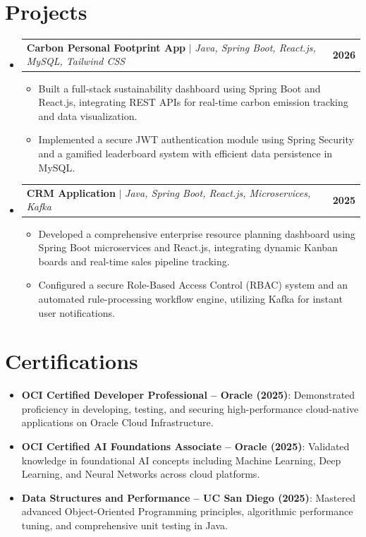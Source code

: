 \documentclass[letterpaper,11pt]{article}
\makeatletter
\newcommand{\resumeItem}[1]{
  \item\small{
    {#1 \vspace{-2pt}}
  }
}
\newcommand{\resumeProjectHeading}[2]{
    \item
    \begin{tabular*}{1.001\textwidth}{l@{\extracolsep{\fill}}r}
      \small#1 & \textbf{\small #2}\\
    \end{tabular*}\vspace{-7pt}
}
\newcommand{\resumeSubHeadingListStart}{\begin{itemize}[leftmargin=0.0in, label={}]}
\newcommand{\resumeSubHeadingListEnd}{\end{itemize}}
\newcommand{\resumeItemListStart}{\begin{itemize}}
\newcommand{\resumeItemListEnd}{\end{itemize}\vspace{-5pt}}
\makeatother
\begin{document}
\section{Projects}
    \vspace{-5pt}
    \resumeSubHeadingListStart
      \resumeProjectHeading
          {\textbf{Carbon Personal Footprint App} $|$ \emph{Java, Spring Boot, React.js, MySQL, Tailwind CSS}}{2026}
          \resumeItemListStart
            \resumeItem{Built a full-stack sustainability dashboard using Spring Boot and React.js, integrating REST APIs for real-time carbon emission tracking and data visualization.}
            \resumeItem{Implemented a secure JWT authentication module using Spring Security and a gamified leaderboard system with efficient data persistence in MySQL.}
          \resumeItemListEnd
          \vspace{-13pt}
      \resumeProjectHeading
          {\textbf{CRM Application} $|$ \emph{Java, Spring Boot, React.js, Microservices, Kafka}}{2025}
          \resumeItemListStart
            \resumeItem{Developed a comprehensive enterprise resource planning dashboard using Spring Boot microservices and React.js, integrating dynamic Kanban boards and real-time sales pipeline tracking.}
            \resumeItem{Configured a secure Role-Based Access Control (RBAC) system and an automated rule-processing workflow engine, utilizing Kafka for instant user notifications.}
          \resumeItemListEnd
    \resumeSubHeadingListEnd
\vspace{-16pt}

\section{Certifications}
  \resumeItemListStart
    \resumeItem{\textbf{OCI Certified Developer Professional – Oracle (2025)}: Demonstrated proficiency in developing, testing, and securing high-performance cloud-native applications on Oracle Cloud Infrastructure.}
    \resumeItem{\textbf{OCI Certified AI Foundations Associate – Oracle (2025)}: Validated knowledge in foundational AI concepts including Machine Learning, Deep Learning, and Neural Networks across cloud platforms.}
    \resumeItem{\textbf{Data Structures and Performance – UC San Diego (2025)}: Mastered advanced Object-Oriented Programming principles, algorithmic performance tuning, and comprehensive unit testing in Java.}
  \resumeItemListEnd
\end{document}
